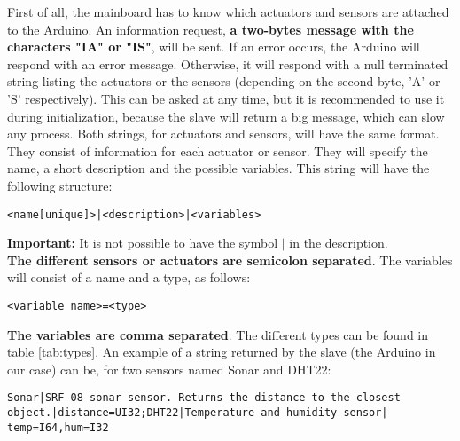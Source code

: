 \documentclass[11pt,a4paper,oneside]{book}
\begin{document}
First of all, the mainboard has to know which actuators and sensors are attached to the Arduino. An information request,\textbf{ a two-bytes message with the characters "IA" or "IS"}, will be sent. If an error occurs, the Arduino will respond with an error message. Otherwise, it will respond with a null terminated string listing the actuators or the sensors (depending on the second byte, 'A' or 'S' respectively). This can be asked at any time, but it is recommended to use it during initialization, because the slave will return a big message, which can slow any process. Both strings, for actuators and sensors, will have the same format. They consist of information for each actuator or sensor. They will specify the name, a short description and the possible variables. This string will have the following structure:

\begin{verbatim}
<name[unique]>|<description>|<variables>
\end{verbatim}

\textbf{Important:} It is not possible to have the symbol $|$ in the description.\\

\textbf{The different sensors or actuators are semicolon separated}. The variables will consist of a name and a type, as follows:

\begin{verbatim}
<variable name>=<type>
\end{verbatim}

\textbf{The variables are comma separated}. The different types can be found in table \ref{tab:types}. An example of a string returned by the slave (the Arduino in our case) can be, for two sensors named Sonar and DHT22:

\begin{verbatim}
Sonar|SRF-08-sonar sensor. Returns the distance to the closest
object.|distance=UI32;DHT22|Temperature and humidity sensor|
temp=I64,hum=I32
\end{verbatim}
\end{document}
